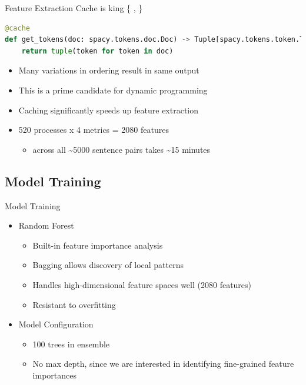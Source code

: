 \documentclass{beamer}
\begin{document}
\begin{frame}[fragile]{Feature Extraction}
    Cache is king \{ \textdollar{}, \texteuro{} \}
    \begin{lstlisting}[language=Python]
@cache
def get_tokens(doc: spacy.tokens.doc.Doc) -> Tuple[spacy.tokens.token.Token, ...]:
    return tuple(token for token in doc)
    \end{lstlisting}
    \begin{itemize}
        \item Many variations in ordering result in same output
        \item This is a prime candidate for dynamic programming
        \item Caching significantly speeds up feature extraction
        \item 520 processes x 4 metrics = 2080 features
        \begin{itemize}
            \item across all \textasciitilde{}5000 sentence pairs takes \textasciitilde{}15 minutes
        \end{itemize}
    \end{itemize}
\end{frame}

\subsection{Model Training}
\begin{frame}{Model Training}
    \begin{itemize}
        \item Random Forest
        \begin{itemize}
            \item Built-in feature importance analysis
            \item Bagging allows discovery of local patterns
            \item Handles high-dimensional feature spaces well (2080 features)
            \item Resistant to overfitting
        \end{itemize}
        \item Model Configuration
        \begin{itemize}
            \item 100 trees in ensemble
            \item No max depth, since we are interested in identifying fine-grained feature importances
        \end{itemize}
    \end{itemize}
\end{frame}
\end{document}
